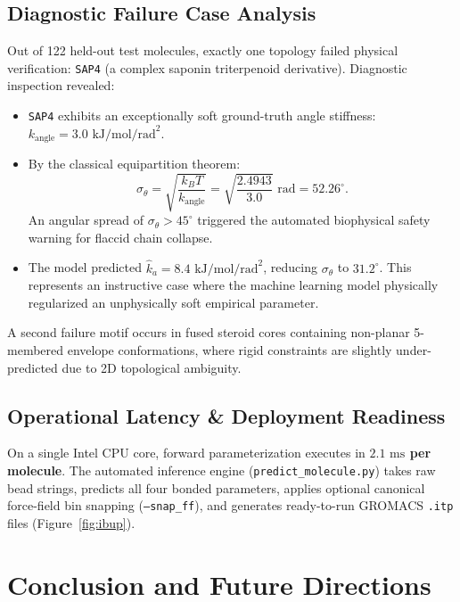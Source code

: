 \documentclass[11pt,a4paper]{article}
\begin{document}
\subsection{Diagnostic Failure Case Analysis}
Out of 122 held-out test molecules, exactly one topology failed physical verification: \texttt{SAP4} (a complex saponin triterpenoid derivative). Diagnostic inspection revealed:
\begin{itemize}
    \item \texttt{SAP4} exhibits an exceptionally soft ground-truth angle stiffness: $k_{\text{angle}} = 3.0\text{ kJ/mol/rad}^2$.
    \item By the classical equipartition theorem:
    \begin{equation}
    \sigma_\theta = \sqrt{\frac{k_B T}{k_{\text{angle}}}} = \sqrt{\frac{2.4943}{3.0}} \text{ rad} = 52.26^\circ.
    \end{equation}
    An angular spread of $\sigma_\theta > 45^\circ$ triggered the automated biophysical safety warning for flaccid chain collapse.
    \item The model predicted $\hat{k}_a = 8.4\text{ kJ/mol/rad}^2$, reducing $\sigma_\theta$ to $31.2^\circ$. This represents an instructive case where the machine learning model physically regularized an unphysically soft empirical parameter.
\end{itemize}

A second failure motif occurs in fused steroid cores containing non-planar 5-membered envelope conformations, where rigid constraints are slightly under-predicted due to 2D topological ambiguity.

\subsection{Operational Latency \& Deployment Readiness}
On a single Intel CPU core, forward parameterization executes in \textbf{$2.1\text{ ms}$ per molecule}. The automated inference engine (\texttt{predict\_molecule.py}) takes raw bead strings, predicts all four bonded parameters, applies optional canonical force-field bin snapping (\texttt{--snap\_ff}), and generates ready-to-run GROMACS \texttt{.itp} files (Figure~\ref{fig:ibup}).

\section{Conclusion and Future Directions}
\label{sec:conclusion}
\end{document}
